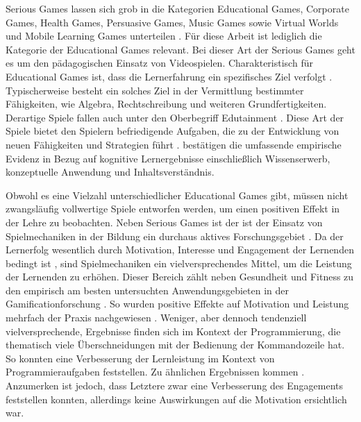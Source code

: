 Serious Games lassen sich grob in die Kategorien Educational  Games, 
Corporate  Games,  Health  Games,  Persuasive  Games,  Music  Games  sowie  Virtual  Worlds  und 
Mobile Learning Games unterteilen \cite[S.4]{bopp_serious_2009}.
Für diese Arbeit ist lediglich die Kategorie der Educational  Games relevant.
Bei dieser Art der Serious Games geht es um den pädagogischen Einsatz von Videospielen.
Charakteristisch für Educational  Games ist, dass die Lernerfahrung ein spezifisches Ziel verfolgt \cite{nielsen_overview_2006, bopp_serious_2009}.
Typischerweise besteht ein solches Ziel in der Vermittlung bestimmter Fähigkeiten, wie Algebra, Rechtschreibung und weiteren Grundfertigkeiten.
Derartige Spiele fallen auch unter den Oberbegriff Edutainment \cite{nielsen_overview_2006}.
Diese Art der Spiele bietet den Spielern befriedigende Aufgaben, die zu der Entwicklung von neuen Fähigkeiten und Strategien führt \cite{stapleton_serious_2004}.
\citeauthor{vlachopoulos_effect_2017} bestätigen die umfassende empirische Evidenz in Bezug auf kognitive Lernergebnisse einschließlich Wissenserwerb, konzeptuelle Anwendung und Inhaltsverständnis.

Obwohl es eine Vielzahl unterschiedlicher Educational Games gibt, müssen nicht zwangsläufig vollwertige Spiele entworfen werden, um einen positiven Effekt in der Lehre zu beobachten. Neben Serious Games ist der ist der Einsatz von Spielmechaniken in der Bildung ein durchaus aktives Forschungsgebiet \cite{ibanez_gamification_2014,landers_enhancing_2017}. Da der Lernerfolg wesentlich durch Motivation, Interesse und Engagement der Lernenden bedingt ist \cite{astin_student_1984}, sind Spielmechaniken ein vielversprechendes Mittel, um die Leistung der Lernenden zu erhöhen.
Dieser Bereich zählt neben Gesundheit und Fitness zu den empirisch am besten untersuchten Anwendungsgebieten in der Gamificationforschung \cite{koivisto_rise_2019}.
So wurden positive Effekte auf Motivation und Leistung mehrfach der Praxis nachgewiesen \cite{ibanez_gamification_2014,hamzah_influence_2015,strmecki_gamification_2015}. Weniger, aber dennoch tendenziell vielversprechende, Ergebnisse finden sich im Kontext der Programmierung, die thematisch viele Überschneidungen mit der Bedienung der Kommandozeile hat. So konnten  eine Verbesserung der Lernleistung im Kontext von Programmieraufgaben feststellen. Zu ähnlichen Ergebnissen kommen \cite{ortiz_gamification_2017}. Anzumerken ist jedoch, dass Letztere zwar eine Verbesserung des Engagements feststellen konnten, allerdings keine Auswirkungen auf die Motivation ersichtlich war.



